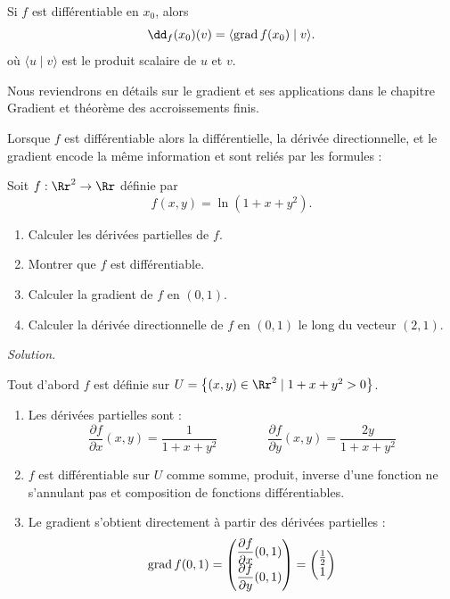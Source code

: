 \documentclass[12pt, class=report,crop=false]{standalone}
\begin{document}
{Si $f$ est différentiable en $x_0$, alors
$$\dd_f (x_0) (v) = \langle \grad f (x_0) \mid v \rangle.$$
où $\langle u \mid v \rangle$ est le produit scalaire de $u$ et $v$.

Nous reviendrons en détails sur le gradient et ses applications dans le chapitre \og{}Gradient et théorème des accroissements finis\fg{}.


\bigskip
{}

Lorsque $f$ est différentiable alors la différentielle, la dérivée directionnelle, et le gradient encode la même information et sont reliés  
par les formules :



\begin{exemple}
Soit $f : \Rr^2 \to \Rr$ définie par 
$$f(x,y) =  \ln(1+x+y^2).$$

\begin{enumerate}
  \item Calculer les dérivées partielles de $f$.
  \item Montrer que $f$ est différentiable.
  \item Calculer la gradient de $f$ en $(0,1)$.
  \item Calculer la dérivée directionnelle de $f$ en $(0,1)$ le long du vecteur $(2,1)$.
\end{enumerate}
 
\bigskip
\emph{Solution.}


Tout d'abord $f$ est définie sur $U = \big\{ (x,y) \in \Rr^2 \mid 1+x+y^2>0 \big\}$.



\begin{enumerate}
  \item Les dérivées partielles sont :
  $$\frac{\partial f}{\partial x}(x,y) = \frac{1}{1+x+y^2} \qquad\qquad
  \frac{\partial f}{\partial y}(x,y) = \frac{2y}{1+x+y^2}$$
  
  
  \item $f$ est différentiable sur $U$ comme somme, produit, inverse d'une fonction ne s'annulant pas et composition de fonctions différentiables.
  
  \item Le gradient s'obtient directement à partir des dérivées partielles :
  $$\operatorname{grad} f (0,1) = \begin{pmatrix} \dfrac{\partial f}{\partial x}(0,1) \\\dfrac{\partial f}{\partial y}(0,1) \end{pmatrix} = 
\begin{pmatrix} \frac12 \\ 1 \end{pmatrix}$$
  

\end{enumerate}
\end{exemple}}
\end{document}
